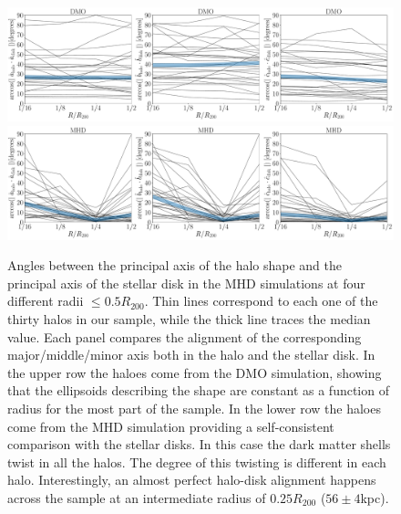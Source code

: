 \documentclass[a4paper,fleqn,usenatbib]{mnras}
\begin{document}
\begin{figure}
\begin{center}
\includegraphics[width=1.0\textwidth]{angles_alignment_DM.pdf}
\includegraphics[width=1.0\textwidth]{angles_alignment_MHD.pdf}
\end{center}
\caption{Angles between the
  principal axis of the halo shape and the principal axis of the
  stellar disk in the MHD simulations at four different radii $\leq 0.5R_{200}$.
  Thin lines correspond to each one of the thirty halos in our sample,
  while the thick line traces the median value.
  Each panel compares the alignment of the corresponding
  major/middle/minor axis both in the halo and the stellar disk.
  In the upper row the haloes come from the DMO simulation, 
  showing that the ellipsoids describing the
  shape are constant as a function of radius for the most part of the
  sample.
  In the lower row the haloes come from the MHD simulation providing a 
  self-consistent comparison with the stellar disks. 
  In this case the dark matter shells twist in all the halos.
  The degree of this twisting is different in each halo.
  Interestingly, an almost perfect halo-disk alignment happens across
  the sample at an intermediate radius of $0.25R_{200}$ ($56\pm 4$kpc).
}
\label{fig:cumulative_alignment}
\end{figure}
\end{document}
